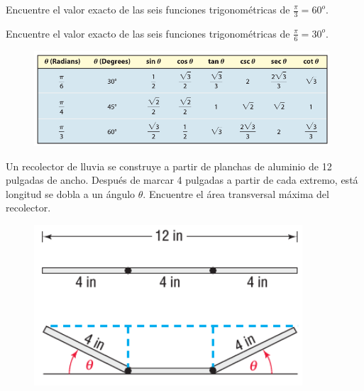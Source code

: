 {}
	\begin{problema}
		\label{exmp:0606}
		Encuentre el valor exacto de las seis funciones trigonométricas de $\frac{\pi}{3}=60^{o}$.
	\end{problema}
	

{}
	\begin{problema}
		\label{exmp:0607}
		Encuentre el valor exacto de las seis funciones trigonométricas de $\frac{\pi}{6}=30^{o}$.
	\end{problema}
	

{}
	\begin{figure}[h]
		\centering
		\includegraphics[width=11cm,keepaspectratio=true]{./trig/sull06t3.png}
		\label{fig:tab3}
	\end{figure}
	

{}
	\begin{problema}
		Un recolector de lluvia se construye a partir de planchas de aluminio de 12 pulgadas de ancho. Después de marcar 4 pulgadas a partir de cada extremo, está longitud se dobla a un ángulo $\theta$. Encuentre el área transversal máxima del recolector. 
	\end{problema}


	\begin{figure}[h]
		\centering
		\includegraphics[width=10cm,keepaspectratio=true]{./trig/sull0627.png}
		\label{fig:0627}
	\end{figure}




